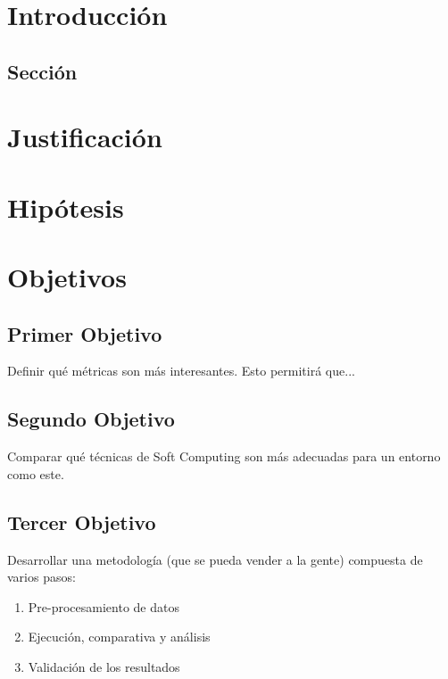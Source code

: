 \chapter{Introducción}
\label{ch:intro}

\section{Sección}
\label{sec:s}

\chapter{Justificación}
\label{ch:just}

\chapter{Hipótesis}
\label{ch:hipotesis}

\chapter{Objetivos}
\label{ch:objetivos}

\section{Primer Objetivo}
\label{sec:metricas}

Definir qué métricas son más interesantes. Esto permitirá que...

\section{Segundo Objetivo}
\label{sec:comparar}

Comparar qué técnicas de Soft Computing son más adecuadas para un entorno como este.

\section{Tercer Objetivo}
\label{sec:metodologia}

Desarrollar una metodología (que se pueda vender a la gente) compuesta de varios pasos:
\begin{enumerate}
  \item Pre-procesamiento de datos
  \item Ejecución, comparativa y análisis
  \item Validación de los resultados
\end{enumerate}

